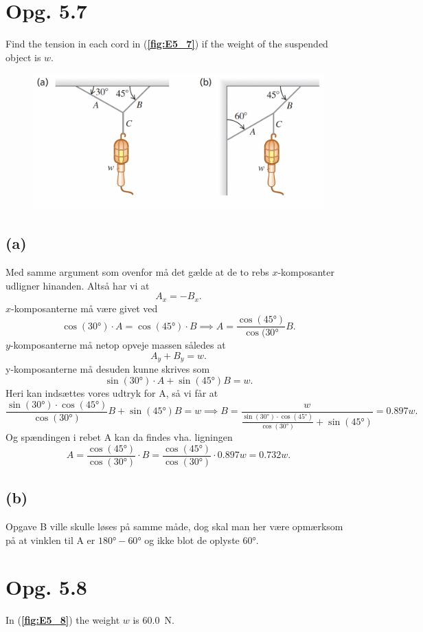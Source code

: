 \documentclass[12pt]{article}
\begin{document}
\section*{Opg. 5.7} 
Find the tension in each cord in (\textbf{\autoref{fig:E5_7}}) if the weight of the suspended object is $w$.

\begin{figure} [ht]
  \centering
  \caption{}
  \includegraphics[width=0.75\linewidth]{../figures/E5_7.png}
  \label{fig:E5_7}
\end{figure}

\subsection*{(a)}
Med samme argument som ovenfor må det gælde at de to rebs $x$-komposanter udligner hinanden. Altså har vi at
 \[
A_x =- B_x
.\] 
$x$-komposanterne må være givet ved
 \[
\cos( \ang{30}) \cdot A = \cos( \ang{45}) \cdot B \implies A = \frac{\cos(\ang{45})}{\cos(\ang{30}}B
.\] 
$y$-komposanterne må netop opveje massen således at
 \[
A_y + B_y = w
.\]
y-komposanterne må desuden kunne skrives som
\[
\sin(\ang{30})\cdot A + \sin(\ang{45})B = w
.\] 
Heri kan indsættes vores udtryk for A, så vi får at
\[
  \frac{\sin(\ang{30})\cdot \cos(\ang{45})}{\cos(\ang{30})}B + \sin(\ang{45})B = w \implies B = \frac{w}{\frac{\sin(\ang{30})\cdot \cos(\ang{45})}{\cos(\ang{30})}+\sin(\ang{45})} = \num{0,897}w
.\]
Og spændingen i rebet A kan da findes vha. ligningen
\[
  A = \frac{\cos(\ang{45})}{\cos(\ang{30})}\cdot B = \frac{\cos(\ang{45})}{\cos(\ang{30})} \cdot \num{0,897}w = \num{0,732}w
.\] 


\subsection*{(b)}
Opgave B ville skulle løses på samme måde, dog skal man her være opmærksom på at vinklen til A er $\ang{180}-\ang{60}$ og ikke blot de oplyste \ang{60}.

\section*{Opg. 5.8}
In (\textbf{\autoref{fig:E5_8}}) the weight $w$ is  \qty{60.0}{N}.
\end{document}
